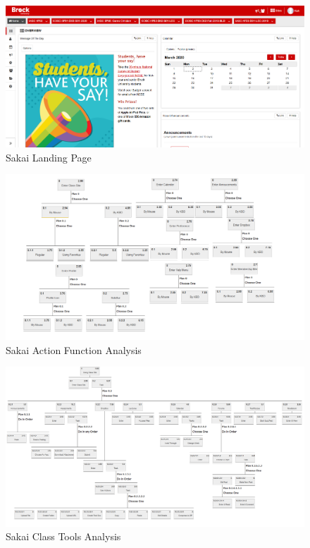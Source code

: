 \documentclass[12pt]{article}
\begin{document}
    \begin{figure}[H]
        \includegraphics[width=\textwidth]{hta/Sakai.png}
        \caption{Sakai Landing Page}
    \end{figure}
    \begin{figure}[H]
        \includegraphics[width=\textwidth]{hta/Sakai_Access_Function.png}
        \caption{Sakai Action Function Analysis}
    \end{figure}
    \begin{figure}[H]
        \includegraphics[width=\textwidth]{hta/Sakai_Class_Tools.png}
        \caption{Sakai Class Tools Analysis}
    \end{figure}
\end{document}
